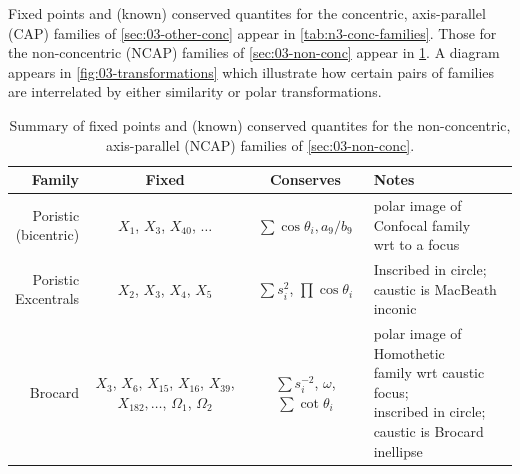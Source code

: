 Fixed points and (known) conserved quantites for the concentric, axis-parallel (CAP) families of \cref{sec:03-other-conc} appear in
\cref{tab:n3-conc-families}. Those for the non-concentric (NCAP) families of \cref{sec:03-non-conc} appear in
\cref{tab:n3-non-conc-families}. A diagram appears in \cref{fig:03-transformations} which illustrate how certain pairs of families are interrelated by either similarity or polar transformations.

\begin{table}
\centering
\begin{tabular}{|r|c|c|l|}
\hline
Family & Fixed & Conserves & Notes \\
\hline
\makecell[rc]{Poristic\\(bicentric)} & $X_1$, $X_3$, $X_{40}$, $\ldots$ & $\sum\cos\theta_i,a_9/b_9$ & \makecell[lc]{polar image of Confocal family\\wrt to a focus} \\
\hline
\makecell[rt]{Poristic\\Excentrals} & $X_2$, $X_3$, $X_4$, $X_5$ & $\sum{s_i^2}$, $\prod\cos\theta_i$ & \makecell[lt]{Inscribed in circle;\\caustic is MacBeath inconic} \\
\hline
Brocard & \makecell[lc]{$X_3$, $X_6$, $X_{15}$, $X_{16}$,\\$X_{39}$, $X_{182},\ldots$,\\$\Omega_1$, $\Omega_2$} & $\sum{s_i^{-2}}$, $\omega$, $\sum\cot\theta_i$ & \makecell[lc]{polar image of Homothetic\\family wrt caustic focus;\\inscribed in circle;\\caustic is Brocard inellipse}\\
\hline
\end{tabular}
\caption{Summary of fixed points and (known) conserved quantites for the non-concentric, axis-parallel (NCAP) families of \cref{sec:03-non-conc}.}
\label{tab:n3-non-conc-families}
\end{table}

